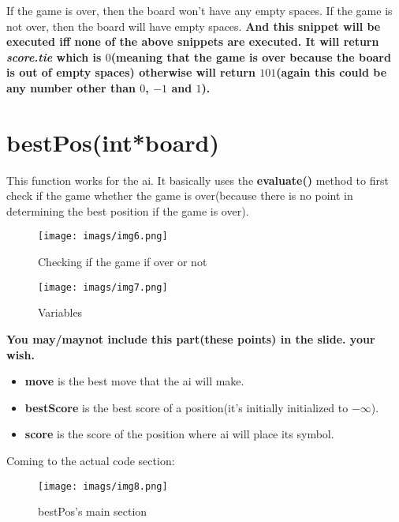 \documentclass{article}
\makeatletter
\renewcommand\paragraph{\@startsection{paragraph}{4}{\z@}{-3.25ex \@plus -1ex \@minus -.2ex}{1.5ex \@plus .2ex}{\normalfont\normalsize\bfseries}}
\makeatother
\begin{document}
If the game is over, then the board won't have any empty spaces. If the game is not over, then the board will have empty spaces. \textbf{And this snippet will be executed iff none of the above snippets are executed. It will return \textit{score.tie} which is $0$(meaning that the game is over because the board is out of empty spaces) otherwise will return $101$(again this could be any number other than $0$, $-1$ and $1$).}

\newpage
\section{bestPos(int*board)}
\paragraph{What it does}

This function works for the ai. It basically uses the \textbf{evaluate()} method to first check if the game whether the game is over(because there is no point in determining the best position if the game is over).

\begin{figure}[h]
	\centering
	\texttt{[image: imags/img6.png]}
	\caption{Checking if the game if over or not}
	\label{fig:fig6}
\end{figure}

\begin{figure}[h]
	\centering
	\texttt{[image: imags/img7.png]}
	\caption{Variables}
	\label{fig:fig7}
\end{figure}

\textbf{You may/maynot include this part(these points) in the slide. your wish.}
\begin{itemize}
	\item \textbf{move} is the best move that the ai will make.
	\item \textbf{bestScore} is the best score of a position(it's initially initialized to $-\infty$).
	\item \textbf{score} is the score of the position where ai will place its symbol.
\end{itemize}
\newpage
Coming to the actual code section:

\begin{figure}[h]
	\centering
	\texttt{[image: imags/img8.png]}
	\caption{bestPos's main section}
	\label{fig:fig8}
\end{figure}
\end{document}
